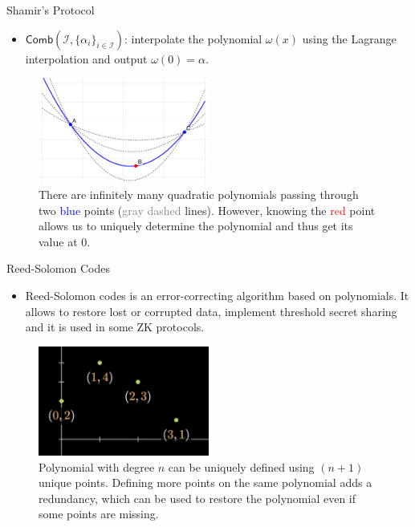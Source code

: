 \documentclass{beamer}
\begin{document}
    \begin{frame}{Shamir's Protocol}
      \begin{definition}
        \begin{itemize}
            \item $\mathsf{Comb}(\mathcal{I}, \{\alpha_i\}_{i \in \mathcal{I}})$: interpolate the polynomial $\omega(x)$ using the Lagrange interpolation and output $\omega(0) = \alpha$.
        \end{itemize}
      \end{definition}

      \begin{figure}
        \centering
        \includegraphics[width=0.5\textwidth]{images/lecture_1/shamir_demo.pdf}
        \caption{There are infinitely many quadratic polynomials passing through two \textcolor{blue}{blue} points (\textcolor{gray}{gray dashed} lines). However, knowing the \textcolor{red}{red} point allows us to uniquely determine the polynomial and thus get its value at $0$.}
        \label{fig:shamir}
      \end{figure}
    \end{frame}

    \begin{frame}{Reed-Solomon Codes}
        \begin{definition}
            \begin{itemize}
                \item Reed-Solomon codes is an error-correcting algorithm based on polynomials. It allows to restore lost or corrupted data, implement threshold secret sharing and it is used in some ZK protocols.
            \end{itemize}
          \end{definition}
  
        \begin{figure}
          \centering
          \includegraphics[width=0.5\textwidth]{images/lecture_2/reed-solomon-1.png}
          \caption{Polynomial with degree $n$ can be uniquely defined using $(n+1)$ unique points. Defining more points on the same polynomial adds a redundancy, which can be used to restore the polynomial even if some points are missing.}
          \label{fig:shamir}
        \end{figure}
    \end{frame}
\end{document}
